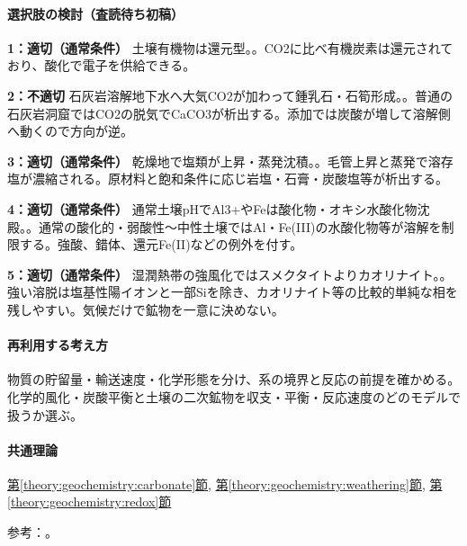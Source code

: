 \paragraph{選択肢の検討（査読待ち初稿）}\mbox{}\par

\noindent\textbf{1：適切（通常条件）} 土壌有機物は還元型。。CO2に比べ有機炭素は還元されており、酸化で電子を供給できる。\par

\noindent\textbf{2：不適切} 石灰岩溶解地下水へ大気CO2が加わって鍾乳石・石筍形成。。普通の石灰岩洞窟ではCO2の脱気でCaCO3が析出する。添加では炭酸が増して溶解側へ動くので方向が逆。\par

\noindent\textbf{3：適切（通常条件）} 乾燥地で塩類が上昇・蒸発沈積。。毛管上昇と蒸発で溶存塩が濃縮される。原材料と飽和条件に応じ岩塩・石膏・炭酸塩等が析出する。\par

\noindent\textbf{4：適切（通常条件）} 通常土壌pHでAl3+やFeは酸化物・オキシ水酸化物沈殿。。通常の酸化的・弱酸性〜中性土壌ではAl・Fe(III)の水酸化物等が溶解を制限する。強酸、錯体、還元Fe(II)などの例外を付す。\par

\noindent\textbf{5：適切（通常条件）} 湿潤熱帯の強風化ではスメクタイトよりカオリナイト。。強い溶脱は塩基性陽イオンと一部Siを除き、カオリナイト等の比較的単純な相を残しやすい。気候だけで鉱物を一意に決めない。\par

\paragraph{再利用する考え方} 物質の貯留量・輸送速度・化学形態を分け、系の境界と反応の前提を確かめる。化学的風化・炭酸平衡と土壌の二次鉱物を収支・平衡・反応速度のどのモデルで扱うか選ぶ。

\paragraph{共通理論} \hyperref[theory:geochemistry:carbonate]{第\ref*{theory:geochemistry:carbonate}節}, \hyperref[theory:geochemistry:weathering]{第\ref*{theory:geochemistry:weathering}節}, \hyperref[theory:geochemistry:redox]{第\ref*{theory:geochemistry:redox}節}

\par 参考：\cite{gc_cave,gc_clays,gc_hem,gc_redox}。

